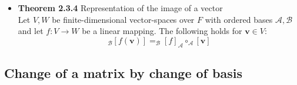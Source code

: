 \documentclass[11pt,a4paper]{article}
\begin{document}
\begin{itemize}
    \item \textbf{Theorem 2.3.4} Representation of the image of a vector \\
        Let $V,W$ be finite-dimensional vector-spaces over $F$ with ordered bases
        $\mathcal{A,B}$ and let $f : V \to W$ be a linear mapping.
        The following holds for $\textbf{v} \in V$:
        \[
            _\mathcal{B}{[f(\textbf{v})]} = _\mathcal{B}{[f]}_\mathcal{A} \circ
            _\mathcal{A}[\textbf{v}]
        \]

\end{itemize}

\subsection{Change of a matrix by change of basis}
\end{document}
